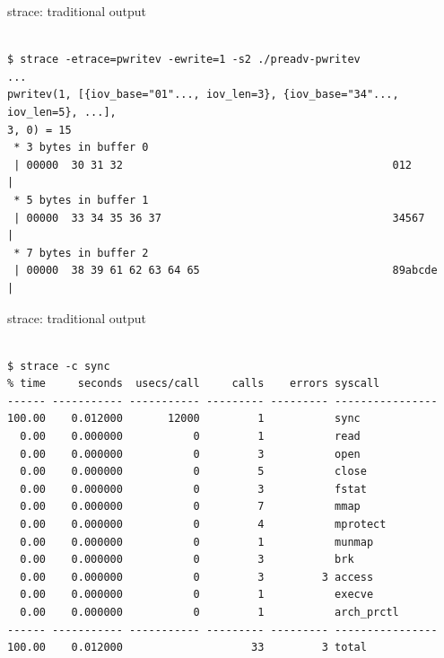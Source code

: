\documentclass[pdf]{beamer}
\begin{document}
\begin{frame}[fragile]{strace: traditional output}
\begin{adjustwidth}{-1em}{-1em}
\begin{scriptsize}
\begin{verbatim}

$ strace -etrace=pwritev -ewrite=1 -s2 ./preadv-pwritev
...
pwritev(1, [{iov_base="01"..., iov_len=3}, {iov_base="34"..., iov_len=5}, ...],
3, 0) = 15
 * 3 bytes in buffer 0
 | 00000  30 31 32                                          012              |
 * 5 bytes in buffer 1
 | 00000  33 34 35 36 37                                    34567            |
 * 7 bytes in buffer 2
 | 00000  38 39 61 62 63 64 65                              89abcde          |
\end{verbatim}
\end{scriptsize}
\end{adjustwidth}
\end{frame}

\begin{frame}[fragile]{strace: traditional output}
\begin{scriptsize}
\begin{verbatim}

$ strace -c sync
% time     seconds  usecs/call     calls    errors syscall
------ ----------- ----------- --------- --------- ----------------
100.00    0.012000       12000         1           sync
  0.00    0.000000           0         1           read
  0.00    0.000000           0         3           open
  0.00    0.000000           0         5           close
  0.00    0.000000           0         3           fstat
  0.00    0.000000           0         7           mmap
  0.00    0.000000           0         4           mprotect
  0.00    0.000000           0         1           munmap
  0.00    0.000000           0         3           brk
  0.00    0.000000           0         3         3 access
  0.00    0.000000           0         1           execve
  0.00    0.000000           0         1           arch_prctl
------ ----------- ----------- --------- --------- ----------------
100.00    0.012000                    33         3 total

\end{verbatim}
\end{scriptsize}
\end{frame}
\end{document}
